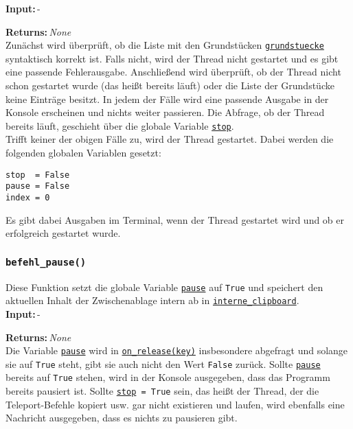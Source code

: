 \documentclass{article}
\newcommand{\bfpara}[1]{\noindent \textbf{#1:}\,}
\begin{document}
\bfpara{Input}-

\bfpara{Returns}\textit{None}\\

Zun\"achst wird \"uberpr\"uft, ob die Liste mit den Grundst\"ucken \hyperref[subsec:globale_variablen]{\texttt{grundstuecke}} syntaktisch korrekt ist. Falls nicht, wird der Thread nicht gestartet und es gibt eine passende Fehlerausgabe. Anschlie{\ss}end wird \"uberpr\"uft, ob der Thread nicht schon gestartet wurde (das hei{\ss}t bereits l\"auft) oder die Liste der Grundst\"ucke keine Eintr\"age besitzt. In jedem der F\"alle wird eine passende Ausgabe in der Konsole erscheinen und nichts weiter passieren. Die Abfrage, ob der Thread bereits l\"auft, geschieht \"uber die globale Variable \hyperref[subsec:globale_variablen]{\texttt{stop}}.\\

Trifft keiner der obigen F\"alle zu, wird der Thread gestartet. Dabei werden die folgenden globalen Variablen gesetzt:
\begin{lstlisting}
stop  = False
pause = False
index = 0
\end{lstlisting}
Es gibt dabei Ausgaben im Terminal, wenn der Thread gestartet wird und ob er erfolgreich gestartet wurde.\\[11pt]

\subsubsection*{\texttt{befehl\_pause()}}
Diese Funktion setzt die globale Variable \hyperref[subsec:globale_variablen]{\texttt{pause}} auf \texttt{True} und speichert den aktuellen Inhalt der Zwischenablage intern ab in \hyperref[subsec:globale_variablen]{\texttt{interne\_clipboard}}.\\

\bfpara{Input}-

\bfpara{Returns}\textit{None}\\

Die Variable \hyperref[subsec:globale_variablen]{\texttt{pause}} wird in \hyperref[subsubsec:on_release]{\texttt{on\_release(key)}} insbesondere abgefragt und solange sie auf \texttt{True} steht, gibt sie auch nicht den Wert \texttt{False} zur\"uck. Sollte \hyperref[subsec:globale_variablen]{\texttt{pause}} bereits auf \texttt{True} stehen, wird in der Konsole ausgegeben, dass das Programm bereits pausiert ist. Sollte \hyperref[subsec:globale_variablen]{\texttt{stop}}\texttt{ = True} sein, das hei{\ss}t der Thread, der die Teleport-Befehle kopiert usw. gar nicht existieren und laufen, wird ebenfalls eine Nachricht ausgegeben, dass es nichts zu pausieren gibt.\\[11pt]
\end{document}
